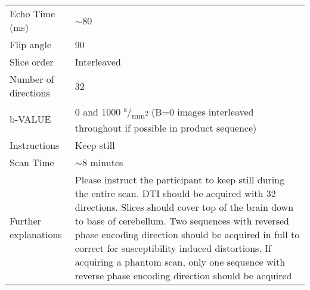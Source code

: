 \begin{table}[H]
\begin{tabularx}{\linewidth}{@{} s | X @{}}
Echo Time (ms)            							& $\sim$80                                                                             \\
Flip angle                								& 90                                                                                   \\
Slice order               								& Interleaved                                                                          \\
Number of directions      						& 32                                                                                   \\
b-VALUE                   								& 0 and 1000 \textsuperscript{s}/\textsubscript{mm\textsuperscript{2}} (B=0 images interleaved throughout if possible in product sequence) \\
Instructions              							& Keep still                                                                           \\
Scan Time                 								& $\sim$8 minutes                                                                      \\
Further explanations      						& Please instruct the participant to keep still during the entire scan. \ac{DTI} should be acquired with 32 directions. Slices should cover top of the brain down to base of cerebellum. Two sequences with reversed phase encoding direction should be acquired in full to correct for susceptibility induced distortions. If acquiring a phantom scan, only one sequence with reverse phase encoding direction should be acquired                                                                                     
\end{tabularx}
\end{table}

